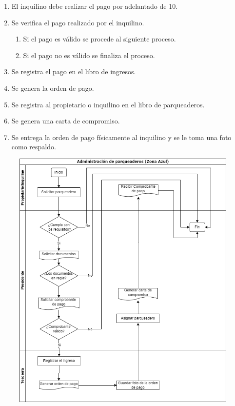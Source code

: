 \begin{itemize}
\begin{enumerate}
        \item El inquilino debe realizar el pago por adelantado de 10\textdollar.
        \item Se verifica el pago realizado por el inquilino.
        \begin{enumerate}
            \item Si el pago es válido se procede al siguiente proceso.
            \item Si el pago no es válido se finaliza el proceso.
        \end{enumerate}
        \item Se registra el pago en el libro de ingresos.
        \item Se genera la orden de pago.
        \item Se registra al propietario o inquilino en el libro de parqueaderos.
        \item Se genera una carta de compromiso.
        \item Se entrega la orden de pago físicamente al inquilino y se le toma una foto como respaldo.
    \end{enumerate}
    \begin{figure}[H]
        \centering
        \includegraphics[width=1\textwidth]{resources/images/Diagrama de flujo parqueadero-actual}

\end{figure}
\end{itemize}
